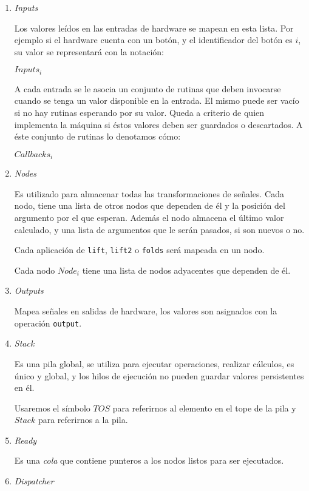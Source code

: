 \begin{enumerate}

\item \emph{Inputs}

  Los valores leídos en las entradas de hardware se mapean
en esta lista. Por ejemplo si el hardware cuenta con un botón,
y el identificador del botón es $i$,
su valor se representará con la notación:

  $Inputs_i$

  A cada entrada se le asocia un conjunto de
rutinas que deben invocarse cuando se tenga un
valor disponible en la entrada. El mismo puede ser vacío si
no hay rutinas esperando por su valor. Queda a criterio de quien
implementa la máquina si éstos valores deben ser guardados o
descartados.
  A éste conjunto de rutinas lo denotamos cómo:

  $Callbacks_i$

\item \emph{Nodes}

  Es utilizado para almacenar todas las transformaciones de señales.
  Cada nodo, tiene una lista de otros nodos que dependen de él y la
  posición del argumento por el que esperan.
  Además el nodo almacena el último valor calculado, y una lista
  de argumentos que le serán pasados, si son nuevos o no.

  Cada aplicación de \texttt{lift}, \texttt{lift2} o \texttt{folds}
será mapeada en un nodo.

  Cada nodo $Node_i$ tiene una lista de nodos adyacentes
que dependen de él.

\item \emph{Outputs}

  Mapea señales en salidas de hardware, los valores
son asignados con la operación \texttt{output}.

\item \emph{Stack}

Es una pila global, se utiliza para ejecutar operaciones,
realizar cálculos, es único
y global, y los hilos de ejecución no pueden guardar valores
persistentes en él.

Usaremos el símbolo $TOS$ para referirnos al elemento en el tope
de la pila y $Stack$ para referirnos a la pila.

\item \emph{Ready}

Es una \emph{cola} que contiene punteros a los nodos
listos para ser ejecutados.

\item \emph{Dispatcher}


\end{enumerate}
